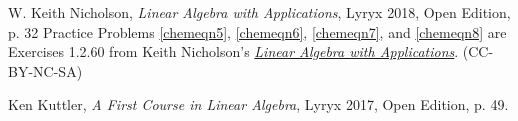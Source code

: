 \documentclass{ximera}
\begin{document}
W. Keith Nicholson, {\it Linear Algebra with Applications}, Lyryx 2018, Open Edition, p. 32 
Practice Problems \ref{chemeqn5}, \ref{chemeqn6}, \ref{chemeqn7}, and \ref{chemeqn8} are Exercises 1.2.60 from Keith Nicholson's \href{https://open.umn.edu/opentextbooks/textbooks/linear-algebra-with-applications}{\it Linear Algebra with Applications}. (CC-BY-NC-SA)

Ken Kuttler, {\it  A First Course in Linear Algebra}, Lyryx 2017, Open Edition, p. 49.  
\end{document}
